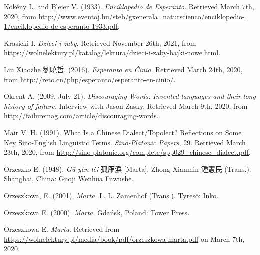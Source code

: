 Kökény L. and Bleier V. (1933). \textit{Enciklopedio de Esperanto}. Retrieved March 7th, 2020, from \url{http://www.eventoj.hu/steb/gxenerala_naturscienco/enciklopedio-1/enciklopedio-de-esperanto-1933.pdf}.

Krasicki I. \textit{Dzieci i żaby}. Retrieved November 26th, 2021, from \url{https://wolnelektury.pl/katalog/lektura/dzieci-i-zaby-bajki-nowe.html}.


Liu Xiaozhe 劉曉哲. (2016). \textit{Esperanto en Ĉinio}. Retrieved March 24th, 2020, from \url{http://reto.cn/php/esperanto/esperanto-en-cinio/}.


Okrent A. (2009, July 21). \textit{Discouraging Words: Invented languages and their long history of failure.} Interview with Jason Zasky. Retrieved March 9th, 2020, from \url{http://failuremag.com/article/discouraging-words}.

Mair V. H. (1991). What Is a Chinese Dialect/Topolect? Reflections on Some Key Sino-English Linguistic Terms. \textit{Sino-Platonic Papers}, 29. Retrieved March 23th, 2020, from \url{http://sino-platonic.org/complete/spp029_chinese_dialect.pdf}.

Orzeszko E. (1948). \textit{Gū yàn lèi} 孤雁淚 [Marta]. Zhong Xianmin 鍾憲民 (Trans.). Shanghai, China: Guoji Wenhua Fuwushe.

Orzeszkowa, E. (2001). \textit{Marta}. L. L. Zamenhof (Trans.). Tyresö: Inko.


Orzeszkowa E. (2000). \textit{Marta}. Gdańsk, Poland: Tower Press.

Orzeszkowa E. \textit{Marta}. Retrieved from \url{https://wolnelektury.pl/media/book/pdf/orzeszkowa-marta.pdf} on March 7th, 2020.


